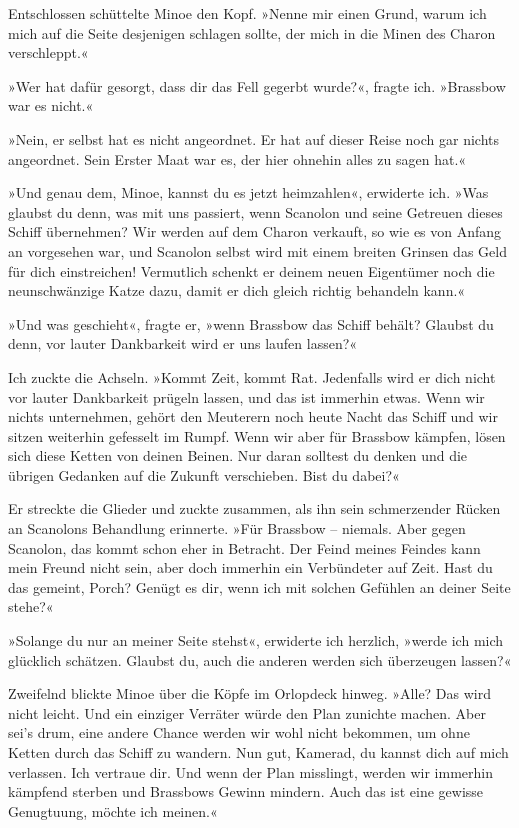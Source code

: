 Entschlossen schüttelte Minoe den Kopf. »Nenne mir einen Grund,
warum ich mich auf die Seite desjenigen schlagen sollte, der mich
in die Minen des Charon verschleppt.«

»Wer hat dafür gesorgt, dass dir das Fell gegerbt wurde?«, fragte
ich. »Brassbow war es nicht.«

»Nein, er selbst hat es nicht angeordnet. Er hat auf dieser Reise
noch gar nichts angeordnet. Sein Erster Maat war es, der hier
ohnehin alles zu sagen hat.«

»Und genau dem, Minoe, kannst du es jetzt heimzahlen«, erwiderte
ich. »Was glaubst du denn, was mit uns passiert, wenn Scanolon und
seine Getreuen dieses Schiff übernehmen? Wir werden auf dem Charon
verkauft, so wie es von Anfang an vorgesehen war, und Scanolon
selbst wird mit einem breiten Grinsen das Geld für dich
einstreichen! Vermutlich schenkt er deinem neuen Eigentümer noch
die neunschwänzige Katze dazu, damit er dich gleich richtig
behandeln kann.«

»Und was geschieht«, fragte er, »wenn Brassbow das Schiff behält?
Glaubst du denn, vor lauter Dankbarkeit wird er uns laufen
lassen?«

Ich zuckte die Achseln. »Kommt Zeit, kommt Rat. Jedenfalls wird er
dich nicht vor lauter Dankbarkeit prügeln lassen, und das ist
immerhin etwas. Wenn wir nichts unternehmen, gehört den Meuterern
noch heute Nacht das Schiff und wir sitzen weiterhin gefesselt im
Rumpf. Wenn wir aber für Brassbow kämpfen, lösen sich diese Ketten
von deinen Beinen. Nur daran solltest du denken und die übrigen
Gedanken auf die Zukunft verschieben. Bist du dabei?«

\bigpar

Er streckte die Glieder und zuckte zusammen, als ihn sein
schmerzender Rücken an Scanolons Behandlung erinnerte. »Für
Brassbow – niemals. Aber gegen Scanolon, das kommt schon eher in
Betracht. Der Feind meines Feindes kann mein Freund nicht sein,
aber doch immerhin ein Verbündeter auf Zeit. Hast du das gemeint,
Porch? Genügt es dir, wenn ich mit solchen Gefühlen an deiner Seite
stehe?«

»Solange du nur an meiner Seite stehst«, erwiderte ich herzlich,
»werde ich mich glücklich schätzen. Glaubst du, auch die anderen
werden sich überzeugen lassen?«

Zweifelnd blickte Minoe über die Köpfe im Orlopdeck hinweg. »Alle?
Das wird nicht leicht. Und ein einziger Verräter würde den Plan
zunichte machen. Aber sei’s drum, eine andere Chance werden wir
wohl nicht bekommen, um ohne Ketten durch das Schiff zu wandern.
Nun gut, Kamerad, du kannst dich auf mich verlassen. Ich vertraue
dir. Und wenn der Plan misslingt, werden wir immerhin kämpfend
sterben und Brassbows Gewinn mindern. Auch das ist eine gewisse
Genugtuung, möchte ich meinen.«

